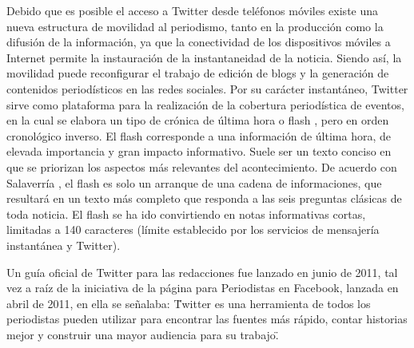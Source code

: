 Debido que es posible el acceso a Twitter desde teléfonos móviles existe una nueva estructura de movilidad al periodismo, tanto en la producción como la difusión de la información, ya que la conectividad de los dispositivos móviles a Internet permite la instauración de la instantaneidad de la noticia. Siendo así, la movilidad puede reconfigurar el trabajo de edición de blogs y la generación de contenidos periodísticos en las redes sociales. 
Por su carácter instantáneo, Twitter sirve como plataforma para la realización de la cobertura periodística de eventos, en la cual se elabora un tipo de crónica de última hora o flash , pero en orden cronológico inverso. El flash corresponde a una información de última hora, de elevada importancia y gran impacto informativo. 
Suele ser un texto conciso en que se priorizan los aspectos más relevantes del acontecimiento. De acuerdo con Salaverría , el flash es solo un arranque de una cadena de informaciones, que resultará en un texto más completo que responda a las seis preguntas clásicas de toda noticia. El flash se ha ido convirtiendo en notas informativas cortas, limitadas a 140 caracteres (límite establecido por los servicios de mensajería instantánea y Twitter).\cite{salaverria2005redaccion}

Un guía oficial de Twitter para las redacciones fue lanzado en junio de 2011, tal vez a raíz de la iniciativa de la página para Periodistas en Facebook, lanzada en abril de 2011, en ella se señalaba: \"Twitter es una herramienta de todos los periodistas pueden utilizar para encontrar las fuentes más rápido, contar historias mejor y construir una mayor audiencia para su trabajo\".
